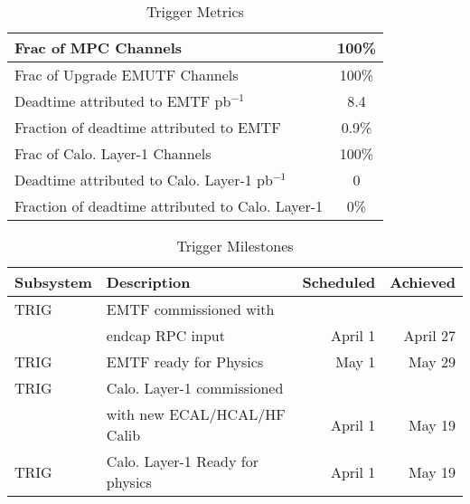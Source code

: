 \documentclass[12pt]{article}
\begin{document}
\begin{table}[htp]
\caption{Trigger Metrics}
\begin{center}
\begin{tabular}{|l|c|}
\hline
Frac of MPC Channels& 100\% \\
\hline
Frac of Upgrade EMUTF Channels& 100\% \\
\hline
Deadtime attributed to EMTF pb$^{-1}$ & 8.4 \\
Fraction of deadtime attributed to EMTF& 0.9\% \\
\hline
Frac of Calo. Layer-1 Channels & 100\% \\
\hline
Deadtime attributed to Calo. Layer-1 pb$^{-1}$ &  0\\
Fraction of deadtime attributed to Calo. Layer-1&  0\% \\
\hline
\end{tabular}
\end{center}
\label{TriggerMetrics}
\end{table}%
 
\begin{table}[h]
\caption{Trigger Milestones }
\begin{center}
\begin{tabular}{|l|l|r|r|}
\hline
Subsystem&Description&Scheduled&Achieved\\
\hline
TRIG&EMTF commissioned with & & \\
    & endcap RPC input &April 1 & April 27 \\
\hline
TRIG&EMTF ready for Physics &May 1& May 29\\
\hline
TRIG&Calo. Layer-1 commissioned &&\\
& with new ECAL/HCAL/HF Calib & April 1 & May 19\\
\hline
TRIG&Calo. Layer-1 Ready for physics&April  1&  May 19\\
\hline
\end{tabular}
\end{center}
\label{TriggerMilestones}
\end{table}%
\end{document}
